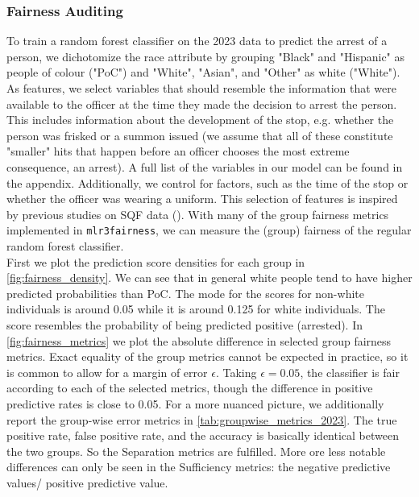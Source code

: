 \subsubsection*{Fairness Auditing}
To train a random forest classifier on the 2023 data to predict the arrest of a person, we dichotomize the race attribute by grouping "Black" and "Hispanic" as people of colour ("PoC") and "White", "Asian", and "Other" as white ("White").
As features, we select variables that should resemble the information that were available to the officer at the time they made the decision to arrest the person. This includes information about the development of the stop, e.g. whether the person was frisked or a summon issued (we assume that all of these constitute "smaller" hits that happen before an officer chooses the most extreme consequence, an arrest). A full list of the variables in our model can be found in the appendix.
Additionally, we control for factors, such as the time of the stop or whether the officer was wearing a uniform. This selection of features is inspired by previous studies on SQF data (\cite{Badr2022DTFANSP}). With many of the group fairness metrics implemented in \texttt{mlr3fairness}, we can measure the (group) fairness of the regular random forest classifier.\\
First we plot the prediction score densities for each group in \autoref{fig:fairness_density}. We can see that in general white people tend to have higher predicted probabilities than PoC. The mode for the scores for non-white individuals is around 0.05 while it is around 0.125 for white individuals. The score resembles the probability of being predicted positive (arrested).
In \autoref{fig:fairness_metrics} we plot the absolute difference in selected group fairness metrics.
Exact equality of the group metrics cannot be expected in practice, so it is common to allow for a margin of error $\epsilon$. Taking $\epsilon = 0.05$, the classifier is fair according to each of the selected metrics, though the difference in positive predictive rates is close to 0.05.
For a more nuanced picture, we additionally report the group-wise error metrics in \autoref{tab:groupwise_metrics_2023}.
The true positive rate, false positive rate, and the accuracy is basically identical between the two groups. So the Separation metrics are fulfilled. More ore less notable differences can only be seen in the Sufficiency metrics: the negative predictive values/ positive predictive value.



